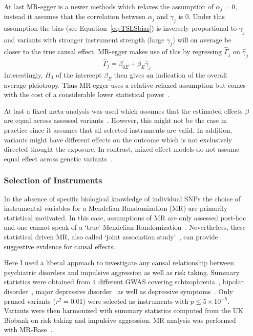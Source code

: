 At last MR-egger is a newer methods which relaxes the assumption of $\alpha_j=0$, instead it assumes that the correlation between $\alpha_j$ and $\gamma_j$ is $0$.
Under this assumption the bias (see Equation~\ref{eq:TSLSbias}) is inversely proportional to $\gamma_j$ and variants with stronger instrument strength (large $\gamma_j$) will on average be closer to the true causal effect.
MR-egger makes use of this by regressing $\hat{\Gamma}_j$ on $\hat{\gamma}_j$
\begin{equation}\label{eq:egger}
  \hat{\Gamma}_j = \beta_{0E} + \beta_{E} \hat{\gamma}_j
\end{equation}
Interestingly, $H_0$ of the intercept $\beta_E$ then gives an indication of the overall average pleiotropy.
Thus MR-egger uses a relative relaxed assumption but comes with the cost of a considerable lower statistical power~\cite{Bowden2015}.

At last a fixed meta-analysis was used which assumes that the estimated effects $\beta$ are equal across assessed variants~\cite{Burgess2015b}.
However, this might not be the case in practice since it assumes that all selected instruments are valid.
In addition, variants might have different effects on the outcome which is not exclusively directed thought the exposure. 
In contrast, mixed-effect models do not assume equal effect across genetic variants~\cite{Burgess2015b}.

\subsubsection{Selection of Instruments}
\label{ssub:Selection_of_Intstuments}

In the absence of specific biological knowledge of individual SNPs the choice of instrumental variables for a Mendelian Randomization (MR) are primarily statistical motivated.
In this case, assumptions of MR are only assessed post-hoc and one cannot speak of a `true' Mendelian Randomization~\cite{Burgess2016a}.
Nevertheless, these statistical driven MR, also called `joint association study'~\cite{Burgess2016a}, can provide suggestive evidence for causal effects.

Here I used a liberal approach to investigate any causal relationship between psychiatric disorders and impulsive aggression as well as risk taking.
Summary statistics were obtained from 4 different GWAS covering schizophrenia~\cite{Ripke2014}, bipolar disorder~\cite{PsychiatricGWASConsortiumBipolarDisorderWorkingGroup2011}, major depressive disorder~\cite{MajorDepressiveDisorderWorkingGroupofthePsychiatricGWASConsortium2013} as well as depressive symptoms~\cite{Okbay2016}.
Only pruned variants ($r^2=0.01$) were selected as instruments with $p\leq 5\times 10^{-5}$.
Variants were then harmonized with summary statistics computed from the UK Biobank on risk taking and impulsive aggression. 
MR analysis was performed with MR-Base~\cite{Hemani2016}.

